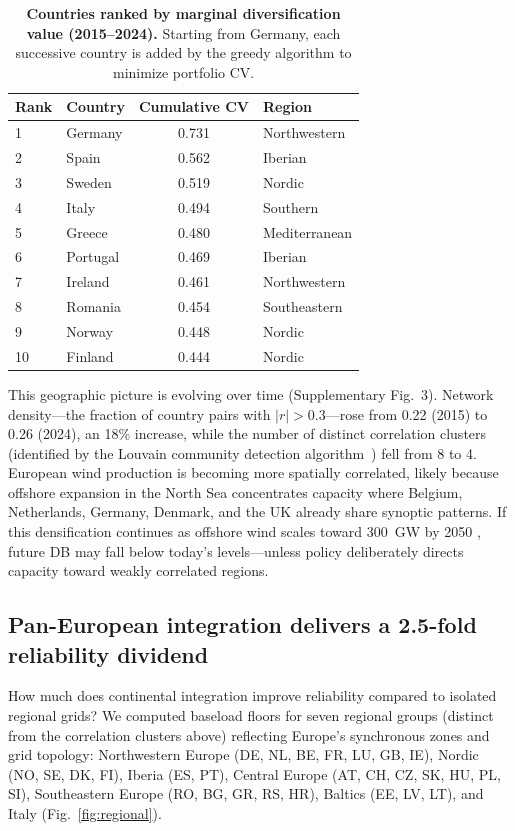 \documentclass{article}
\begin{document}
\begin{table}[!ht]
\centering
\caption{\textbf{Countries ranked by marginal diversification value (2015--2024).} Starting from Germany, each successive country is added by the greedy algorithm to minimize portfolio CV.}
\label{tab:marginal}
\begin{tabular}{llS[table-format=1.3]l}
\toprule
Rank & Country & {Cumulative CV} & Region \\
 & Germany & 0.731 & Northwestern \\
2 & Spain & 0.562 & Iberian \\
3 & Sweden & 0.519 & Nordic \\
4 & Italy & 0.494 & Southern \\
5 & Greece & 0.480 & Mediterranean \\
6 & Portugal & 0.469 & Iberian \\
7 & Ireland & 0.461 & Northwestern \\
8 & Romania & 0.454 & Southeastern \\
9 & Norway & 0.448 & Nordic \\
10 & Finland & 0.444 & Nordic \\
\bottomrule
\end{tabular}
\end{table}

This geographic picture is evolving over time (Supplementary Fig.~3). Network density---the fraction of country pairs with $|r| > 0.3$---rose from 0.22 (2015) to 0.26 (2024), an 18\% increase, while the number of distinct correlation clusters (identified by the Louvain community detection algorithm~\citep{blondel2008}) fell from 8 to 4. European wind production is becoming more spatially correlated, likely because offshore expansion in the North Sea concentrates capacity where Belgium, Netherlands, Germany, Denmark, and the UK already share synoptic patterns. If this densification continues as offshore wind scales toward 300~GW by 2050 \citep{windeurope2024}, future DB may fall below today's levels---unless policy deliberately directs capacity toward weakly correlated regions.


\subsection{Pan-European integration delivers a 2.5-fold reliability dividend}

How much does continental integration improve reliability compared to isolated regional grids? We computed baseload floors for seven regional groups (distinct from the correlation clusters above) reflecting Europe's synchronous zones and grid topology: Northwestern Europe (DE, NL, BE, FR, LU, GB, IE), Nordic (NO, SE, DK, FI), Iberia (ES, PT), Central Europe (AT, CH, CZ, SK, HU, PL, SI), Southeastern Europe (RO, BG, GR, RS, HR), Baltics (EE, LV, LT), and Italy (Fig.~\ref{fig:regional}).
\end{document}
